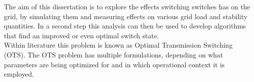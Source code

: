 The aim of this dissertation is to explore the effects switching switches has on the grid, by simulating them
and measuring effects on various grid load and stability quantities. In a second step this analysis can then be
used to develop algorithms that find an improved or even optimal switch state.\\
Within literature this problem is known as Optimal Transmission Switching (OTS)\autocite{ots_lit_review}.
The OTS problem has multiple formulations, depending on what parameters are being optimized for and 
in which operational context it is employed.\\
\\


